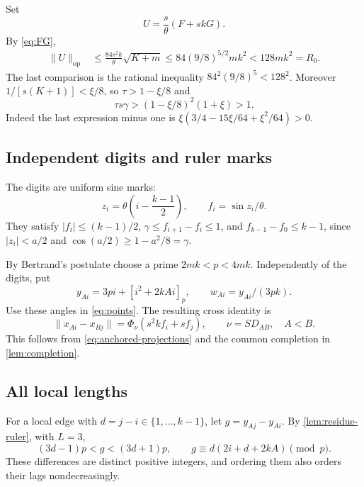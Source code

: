 \documentclass[11pt]{article}
\numberwithin{equation}{section}
\theoremstyle{definition}\newtheorem{definition}[theorem]{Definition}
\theoremstyle{remark}\newtheorem{remark}[theorem]{Remark}
\newcommand{\norm}[1]{\lVert #1\rVert}
\newcommand{\opnorm}[1]{\lVert #1\rVert_{\mathrm{op}}}
\begin{document}
Set
\[
 U=\frac{s}{\theta}(F+skG).
\]
By \eqref{eq:FG},
\begin{align*}
 \opnorm U&\le\frac{84s^2k}{\theta}\sqrt{K+m}
 \le84(9/8)^{5/2}mk^2<128mk^2=R_0.
\end{align*}
The last comparison is the rational inequality $84^2(9/8)^5<128^2$.
Moreover $1/[s(K+1)]<\xi/8$, so $\tau>1-\xi/8$ and
\begin{equation}\label{eq:epsilon-slack}
 \tau s\gamma>(1-\xi/8)^2(1+\xi)>1.
\end{equation}
Indeed the last expression minus one is
$\xi(3/4-15\xi/64+\xi^2/64)>0$.

\subsection{Independent digits and ruler marks}

The digits are uniform sine marks:
\[
 z_i=\theta\left(i-\frac{k-1}{2}\right),\qquad f_i=\sin z_i/\theta.
\]
They satisfy $|f_i|\le(k-1)/2$, $\gamma\le f_{i+1}-f_i\le1$, and
$f_{k-1}-f_0\le k-1$, since $|z_i|<a/2$ and
$\cos(a/2)\ge1-a^2/8=\gamma$.

By Bertrand's postulate choose a prime $2mk<p<4mk$. Independently of the
digits, put
\begin{equation}\label{eq:ruler-epsilon}
 y_{Ai}=3pi+[i^2+2kAi]_p,\qquad w_{Ai}=y_{Ai}/(3pk).
\end{equation}
Use these angles in \eqref{eq:points}. The resulting cross identity is
\begin{equation}\label{eq:epsilon-cross}
 \norm{x_{Ai}-x_{Bj}}=\Phi_\nu(s^2kf_i+sf_j),\qquad \nu=SD_{AB},\quad A<B.
\end{equation}
This follows from \eqref{eq:anchored-projections} and the common completion
in \cref{lem:completion}.

\subsection{All local lengths}

For a local edge with $d=j-i\in\{1,\ldots,k-1\}$, let $g=y_{Aj}-y_{Ai}$.
By \cref{lem:residue-ruler}, with $L=3$,
\begin{equation}\label{eq:ruler-windows}
 (3d-1)p<g<(3d+1)p,\qquad
 g\equiv d(2i+d+2kA)\pmod p.
\end{equation}
These differences are distinct positive integers, and ordering them also
orders their lags nondecreasingly.
\end{document}

